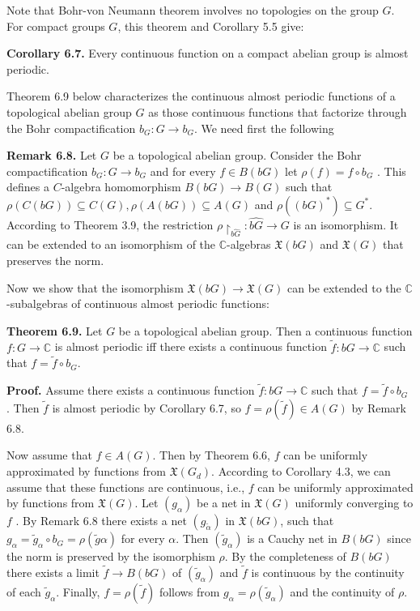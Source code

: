 \documentclass[12pt]{article}
\begin{document}
    Note that Bohr-von Neumann theorem involves no topologies on the group $G$. For compact groups $G$, this theorem and
Corollary 5.5 give:


\textbf{Corollary 6.7.} Every continuous function on a compact abelian group is almost periodic.


    Theorem 6.9 below characterizes the continuous almost periodic functions of a topological abelian group $G$ as those
continuous functions that factorize through the Bohr compactification $b_G : G \to b_G$. We need first the following


    \textbf{Remark 6.8.} Let $G$ be a topological abelian group. Consider the Bohr compactification $b_G : G \to b_G$ and for every $f \in B(bG)$
let $\rho(f ) = f \circ b_G$ . This defines a $C$-algebra homomorphism $B(bG) \to B(G)$ such that $\rho(C(bG)) \subseteq C(G), \rho(A(bG)) \subseteq A(G)$
and $\rho((bG)^*) \subseteq G^*$. According to Theorem 3.9, the restriction $\rho\upharpoonright_{\hat{bG}} : \hat{bG} \to G$ is an isomorphism. It can be extended to an
isomorphism of the $\mathbb{C}$-algebras $\mathfrak{X}(bG)$ and $\mathfrak{X}(G)$ that preserves the norm.


    Now we show that the isomorphism $\mathfrak{X}(bG) \to \mathfrak{X}(G)$ can be extended to the $\mathbb{C}$-subalgebras of continuous almost periodic
functions:


    \textbf{Theorem 6.9.} Let $G$ be a topological abelian group. Then a continuous function $f : G \to \mathbb{C}$ is almost periodic iff there exists a
    continuous function $\tilde{f} : bG \to \mathbb{C}$ such that $f = \tilde{f} \circ b_G$.


\textbf{Proof.} Assume there exists a continuous function $\tilde{f} : bG \to \mathbb{C}$ such that $f = \tilde{f} \circ b_G$ . Then $\tilde{f}$ is almost periodic by
Corollary 6.7, so $f = \rho(\tilde{f}) \in A(G)$ by Remark 6.8.


    Now assume that $f \in A(G)$. Then by Theorem 6.6, $f$ can be uniformly approximated by functions from $\mathfrak{X}(G_d)$. According
to Corollary 4.3, we can assume that these functions are continuous, i.e., $f$ can be uniformly approximated by functions
from $\mathfrak{X}(G)$. Let $(g_\alpha)$ be a net in $\mathfrak{X}(G)$ uniformly converging to $f$ . By Remark 6.8 there exists a net $(g_{\tilde{\alpha}})$ in $\mathfrak{X}(bG)$, such that
$g_\alpha = \tilde{g}_\alpha \circ b_G = \rho(\tilde{g}\alpha)$ for every $\alpha$. Then $(\tilde{g}_\alpha)$ is a Cauchy net in $B(bG)$ since the norm is preserved by the isomorphism $\rho$.
By the completeness of $B(bG)$ there exists a limit $\tilde{f} \to B(bG)$ of $(\tilde{g}_\alpha)$ and $\tilde{f}$ is continuous by the continuity of each $\tilde{g}_\alpha$.
Finally, $f = \rho(\tilde{f} )$ follows from $g_\alpha = \rho(\tilde{g}_{\alpha})$ and the continuity of $\rho$.
\end{document}
